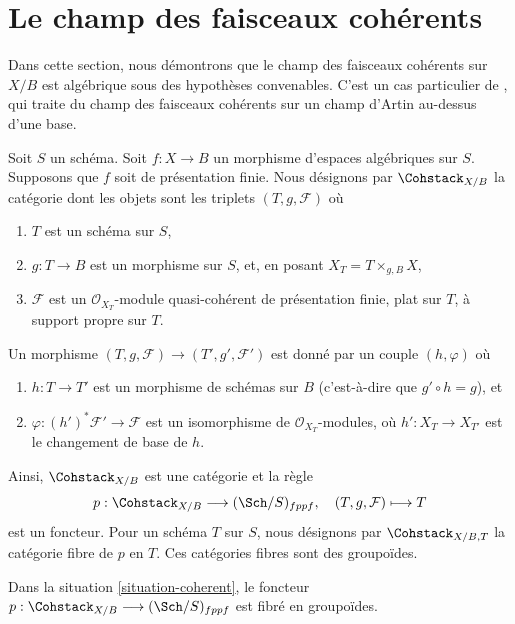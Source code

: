 \section{Le champ des faisceaux cohérents}
\label{section-stack-coherent-sheaves}

\noindent
Dans cette section, nous démontrons que le champ des faisceaux cohérents sur
$X/B$ est algébrique sous des hypothèses convenables. C'est un cas particulier
de \cite[Theorem 2.1.1]{lieblich_remarks}, qui traite du champ des faisceaux
cohérents sur un champ d'Artin au-dessus d'une base.

\begin{situation}
\label{situation-coherent}
Soit $S$ un schéma. Soit $f : X \to B$ un morphisme d'espaces algébriques sur
$S$. Supposons que $f$ soit de présentation finie. Nous désignons par
$\Cohstack_{X/B}$ la catégorie dont les objets sont les triplets
$(T, g, \mathcal{F})$ où
\begin{enumerate}
\item $T$ est un schéma sur $S$,
\item $g : T \to B$ est un morphisme sur $S$, et, en posant
$X_T = T \times_{g, B} X$,
\item $\mathcal{F}$ est un $\mathcal{O}_{X_T}$-module quasi-cohérent de
présentation finie, plat sur $T$, à support propre sur $T$.
\end{enumerate}
Un morphisme $(T, g, \mathcal{F}) \to (T', g', \mathcal{F}')$ est donné par
un couple $(h, \varphi)$ où
\begin{enumerate}
\item $h : T \to T'$ est un morphisme de schémas sur $B$
(c'est-à-dire que $g' \circ h = g$), et
\item $\varphi : (h')^*\mathcal{F}' \to \mathcal{F}$ est un isomorphisme de
$\mathcal{O}_{X_T}$-modules, où $h' : X_T \to X_{T'}$ est le changement de
base de $h$.
\end{enumerate}
\end{situation}

\noindent
Ainsi, $\Cohstack_{X/B}$ est une catégorie et la règle
$$
p : \Cohstack_{X/B} \longrightarrow (\Sch/S)_{fppf},
\quad
(T, g, \mathcal{F}) \longmapsto T
$$
est un foncteur. Pour un schéma $T$ sur $S$, nous désignons par
$\Cohstack_{X/B, T}$ la catégorie fibre de $p$ en $T$. Ces catégories fibres
sont des groupoïdes.

\begin{lemma}
\label{lemma-coherent-fibred-in-groupoids}
Dans la situation \ref{situation-coherent}, le foncteur
$p : \Cohstack_{X/B} \longrightarrow (\Sch/S)_{fppf}$ est fibré en
groupoïdes.
\end{lemma}

